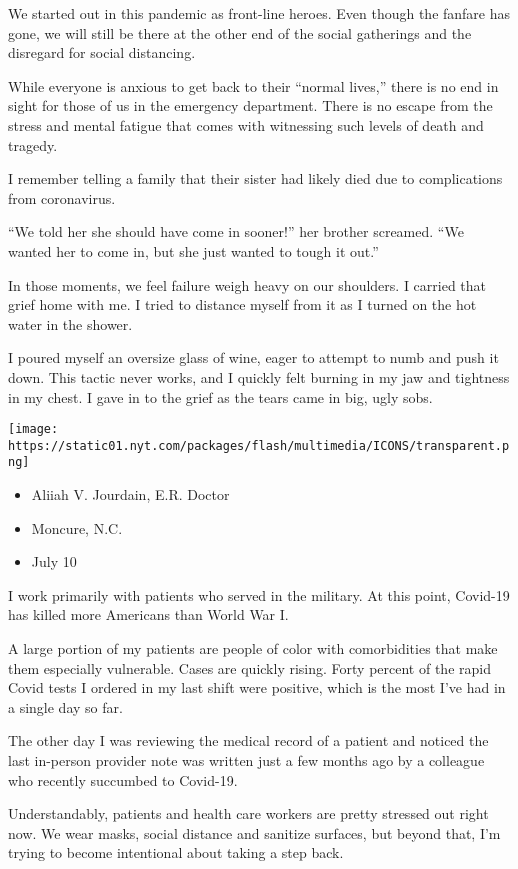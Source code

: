 We started out in this pandemic as front-line heroes. Even though the
fanfare has gone, we will still be there at the other end of the social
gatherings and the disregard for social distancing.

While everyone is anxious to get back to their ``normal lives,'' there
is no end in sight for those of us in the emergency department. There is
no escape from the stress and mental fatigue that comes with witnessing
such levels of death and tragedy.

I remember telling a family that their sister had likely died due to
complications from coronavirus.

``We told her she should have come in sooner!'' her brother screamed.
``We wanted her to come in, but she just wanted to tough it out.''

In those moments, we feel failure weigh heavy on our shoulders. I
carried that grief home with me. I tried to distance myself from it as I
turned on the hot water in the shower.

I poured myself an oversize glass of wine, eager to attempt to numb and
push it down. This tactic never works, and I quickly felt burning in my
jaw and tightness in my chest. I gave in to the grief as the tears came
in big, ugly sobs.

\texttt{[image: https://static01.nyt.com/packages/flash/multimedia/ICONS/transparent.png]}

\begin{itemize}
\tightlist
\item
  Aliiah V. Jourdain, E.R. Doctor
\item
  Moncure, N.C.
\item
  July 10
\end{itemize}

I work primarily with patients who served in the military. At this
point, Covid-19 has killed more Americans than World War I.

A large portion of my patients are people of color with comorbidities
that make them especially vulnerable. Cases are quickly rising. Forty
percent of the rapid Covid tests I ordered in my last shift were
positive, which is the most I've had in a single day so far.

The other day I was reviewing the medical record of a patient and
noticed the last in-person provider note was written just a few months
ago by a colleague who recently succumbed to Covid-19.

Understandably, patients and health care workers are pretty stressed out
right now. We wear masks, social distance and sanitize surfaces, but
beyond that, I'm trying to become intentional about taking a step back.

